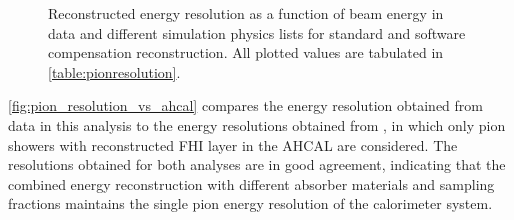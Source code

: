 \documentclass[twoside,a4paper,12pt]{article}
\begin{document}
\begin{figure}[htbp]
\begin{center}
	\hfill
\end{center}
	\caption{Reconstructed energy resolution as a function of beam energy in data and different simulation physics lists for standard and software compensation reconstruction. All plotted values are tabulated in \autoref{table:pionresolution}.}
	\label{fig:pion_resolution_plots}
\end{figure}

\autoref{fig:pion_resolution_vs_ahcal} compares the energy resolution obtained from data in this analysis to the energy resolutions obtained from \cite{SCPaper}, in which only pion showers with reconstructed FHI layer in the AHCAL are considered. The resolutions obtained for both analyses are in good agreement, indicating that the combined energy reconstruction with different absorber materials and sampling fractions maintains the single pion energy resolution of the calorimeter system.
\end{document}
